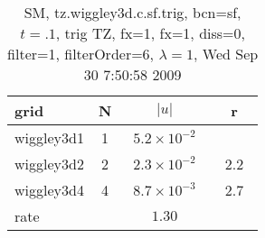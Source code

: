 \begin{table}[hbt]\tableFont %
\begin{center}
\begin{tabular}{|l|c|c|c|} \hline 
grid  & N &  $\vert u \vert$   & r \\ \hline 
          wiggley3d1 &     1 & ~$5.2\times10^{ -2}$~ &            \\ \hline
          wiggley3d2 &     2 & ~$2.3\times10^{ -2}$~ & ~$  2.2$~  \\ \hline
          wiggley3d4 &     4 & ~$8.7\times10^{ -3}$~ & ~$  2.7$~  \\ \hline
    rate             &       &       $1.30$         &        \\ \hline
\end{tabular}
\caption{SM, tz.wiggley3d.c.sf.trig, bcn=sf, $t=.1$, trig TZ, fx=1, fx=1, diss=0, filter=1, filterOrder=6, $\lambda=1$, Wed Sep 30  7:50:58 2009}\label{table:tz.wiggley3d.c.sf.trig}
\end{center}
\end{table}
